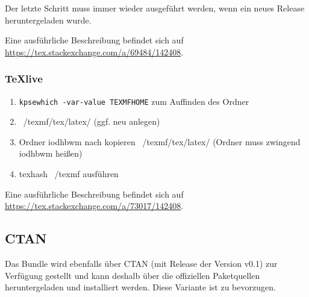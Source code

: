\documentclass[babel=ngerman,highlight=false]{skdoc}
\begin{document}
                Der letzte Schritt muss immer wieder ausgeführt werden, wenn ein neues Release heruntergeladen wurde.
                
                Eine ausführliche Beschreibung befindet sich auf \url{https://tex.stackexchange.com/a/69484/142408}.
            
            \subsubsection{TeXlive}
                
                \begin{enumerate}
                    \item \verb|kpsewhich -var-value TEXMFHOME| zum Auffinden des Ordner
                    \item ~/texmf/tex/latex/ (ggf. neu anlegen)
                    \item  Ordner iodhbwm nach kopieren ~/texmf/tex/latex/ (Ordner muss zwingend iodhbwm heißen)
                    \item texhash ~/texmf ausführen
                \end{enumerate}
            
                Eine ausführliche Beschreibung befindet sich auf \url{https://tex.stackexchange.com/a/73017/142408}.
                
        \subsection{CTAN}
            Das Bundle wird ebenfalls über CTAN (mit Release der Version v0.1) zur Verfügung gestellt und kann deshalb über die offiziellen Paketquellen heruntergeladen und installiert werden. Diese Variante ist zu bevorzugen.

    \PrintIndex
\end{document}
